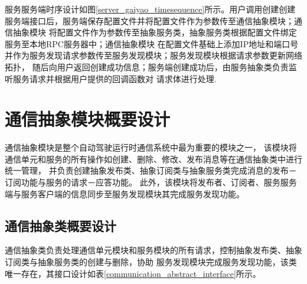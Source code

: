 服务服务端时序设计如图\ref{server_gaiyao_timesequence}所示。用户调用创建创建服务端接口后，服务端保存配置文件并将配置文件作为参数传至通信抽象模块；通信抽象模块
将配置文件作为参数传至抽象服务类，抽象服务类根据配置文件绑定服务至本地RPC服务器中；通信抽象模块
在配置文件基础上添加IP地址和端口号并作为服务发现请求参数传至服务发现模块；服务发现模块根据请求参数更新网络拓扑，
随后向用户返回创建成功信息；服务端创建成功后，由服务抽象类负责监听服务请求并根据用户提供的回调函数对
请求体进行处理.


\section{通信抽象模块概要设计}
通信抽象模块是整个自动驾驶运行时通信系统中最为重要的模块之一，
该模块将通信单元和服务的所有操作如创建、删除、修改、发布消息等在通信抽象类中进行统一管理，
并负责创建抽象发布类、抽象订阅类与抽象服务类完成消息的发布－订阅功能与服务的请求－应答功能。
此外，该模块将发布者、订阅者、服务服务端与服务客户端的信息同步至服务发现模块其完成服务发现功能。


\subsection{通信抽象类概要设计}
通信抽象类负责处理通信单元模块和服务模块的所有请求，控制抽象发布类、抽象订阅类与抽象服务类的创建与删除，协助
服务发现模块完成服务发现功能，该类唯一存在，其接口设计如表\ref{communication_abstract_interface}所示。
 

